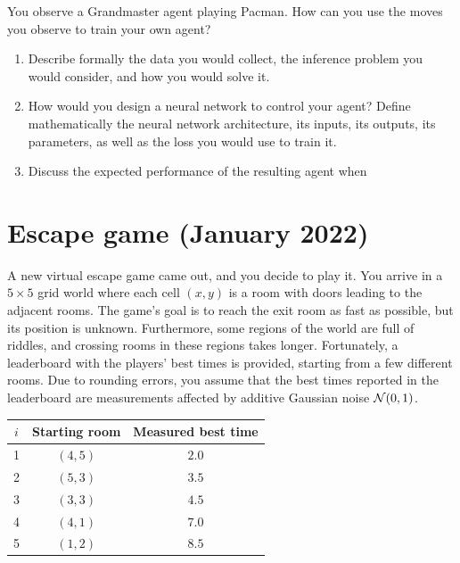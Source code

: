 \documentclass[11pt, a4paper]{article}
\begin{document}
You observe a Grandmaster agent playing Pacman. How can you use the moves you observe to train your own agent?

\begin{enumerate}
    \item Describe formally the data you would collect, the inference problem you would consider, and how you would solve it.

    \item How would you design a neural network to control your agent? Define mathematically the neural network architecture, its inputs, its outputs, its parameters, as well as the loss you would use to train it.

    \item Discuss the expected performance of the resulting agent when 
\end{enumerate}

\newpage

\section{Escape game (January 2022)}

A new virtual escape game came out, and you decide to play it. You arrive in a $5 \times 5$ grid world where each cell $(x, y)$ is a room with doors leading to the adjacent rooms. The game's goal is to reach the exit room as fast as possible, but its position is unknown. Furthermore, some regions of the world are full of riddles, and crossing rooms in these regions takes longer. Fortunately, a leaderboard with the players' best times is provided, starting from a few different rooms. Due to rounding errors, you assume that the best times reported in the leaderboard are measurements affected by additive Gaussian noise $\mathcal{N}(0, 1)$.

\begin{table}[h]
    \centering
    \begin{tabular}{c|cc}
        \toprule
        $i$ & Starting room & Measured best time \\
        \midrule
        1 & $(4, 5)$ & $2.0$ \\
        2 & $(5, 3)$ & $3.5$ \\
        3 & $(3, 3)$ & $4.5$ \\
        4 & $(4, 1)$ & $7.0$ \\
        5 & $(1, 2)$ & $8.5$ \\
        \bottomrule
    \end{tabular}
\end{table}
\end{document}
